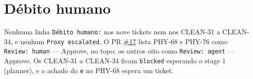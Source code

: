 \documentclass[11pt,a4paper]{article}
\begin{document}
\section{Débito humano}

Nenhuma linha \texttt{Débito humano:} nos nove tickets nem nos CLEAN-31 a
CLEAN-34, e nenhum \texttt{Proxy escalated}. O PR
\href{https://github.com/Laginho/PhysiSyst/pull/17}{\#17} lista PHY-68 e PHY-76
como \texttt{Review: human} --- Approve, no topo; os outros oito como
\texttt{Review: agent} --- Approve. Os CLEAN-31 a CLEAN-34 ficam
\texttt{blocked} esperando o stage 1 (planner), e o achado do \texttt{e} no
PHY-68 espera um ticket.
\end{document}
